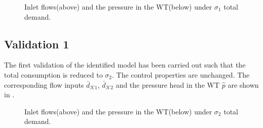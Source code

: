  \begin{figure}[H]
 \centering
  
 \vspace{-2.5mm}
 \end{figure}

 \vspace{-5mm}

 \begin{figure}[H]
 \centering
 \hspace{-4.5mm}
  
 \vspace{-2.5mm}
 \caption{Inlet flows(above) and the pressure in the WT(below) under $\sigma_1$ total demand.}
 \label{fig:identification_example1}
 \end{figure}

 \vspace{-3mm}


 \subsection{Validation 1}
 \label{validation_1}

 The first validation of the identified model has been carried out such that the total consumption is reduced to $\sigma_2$. The control properties are unchanged. The corresponding flow inputs $\bar{d}_{\mathcal{K}1}$, $\bar{d}_{\mathcal{K}2}$ and the pressure head in the WT $\hat{p}$ are shown in . 

 \vspace{-3mm}

 \begin{figure}[H]
 \centering
  
 \vspace{-2.5mm}
 \end{figure}

 \vspace{-5.5mm}

 \begin{figure}[H]
 \centering
 \hspace{-4.5mm}
  
 \vspace{-2.5mm}
 \caption{Inlet flows(above) and the pressure in the WT(below) under $\sigma_2$ total demand.}
 \label{fig:identification_example1_v1}
 \end{figure}

